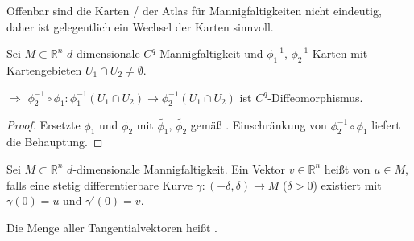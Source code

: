 \begin{underlinedenvironment}[Kartenwechsel]
	Offenbar sind die Karten / der Atlas für Mannigfaltigkeiten nicht eindeutig, daher ist gelegentlich ein Wechsel der Karten sinnvoll.
\end{underlinedenvironment}

\begin{lemma}[Kartenwechsel]
	Sei $M\subset\mathbb{R}^n$ $d$-dimensionale $C^q$-Mannigfaltigkeit und $\phi_1^{-1}$, $\phi_2^{-1}$ Karten mit Kartengebieten $U_1\cap U_2 \neq \emptyset$.\par
	\hspace*{1mm}$\Rightarrow$ $\phi_2^{-1} \circ \phi_1\!: \phi_1^{-1} (U_1\cap U_2) \to \phi_2^{-1} (U_1\cap U_2)$ ist $C^q$-Diffeomorphismus.
\end{lemma}

\begin{proof}
	Ersetzte $\phi_1$ und $\phi_2$ mit $\tilde{\phi_1}$, $\tilde{\phi_2}$ gemäß . Einschränkung von $\phi_2^{-1}\circ\phi_1$ liefert die Behauptung.
\end{proof}

\begin{*definition}
	Sei $M\subset\mathbb{R}^n$ $d$-dimensionale Mannigfaltigkeit. Ein Vektor $v\in\mathbb{R}^n$ heißt  von $u\in M$, falls eine stetig differentierbare Kurve $\gamma\!:(-\delta, \delta)\to M$ ($\delta > 0$) existiert mit $\gamma(0) = u$ und $\gamma'(0) = v$.
	
	Die Menge aller Tangentialvektoren heißt .
\end{*definition}

